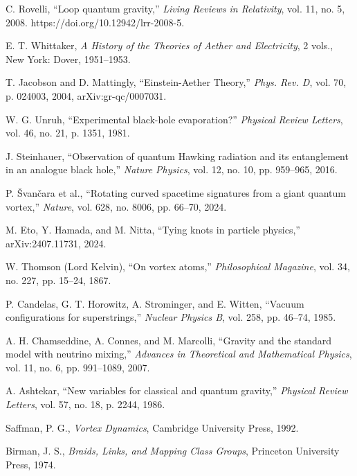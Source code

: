 \begin{thebibliography}{99}

 C. Rovelli, ``Loop quantum gravity,'' \emph{Living Reviews in Relativity}, vol. 11, no. 5, 2008. https://doi.org/10.12942/lrr-2008-5.

 E. T. Whittaker, \emph{A History of the Theories of Aether and Electricity}, 2 vols., New York: Dover, 1951--1953.

 T. Jacobson and D. Mattingly, ``Einstein-Aether Theory,'' \emph{Phys. Rev. D}, vol. 70, p. 024003, 2004, arXiv:gr-qc/0007031.

 W. G. Unruh, ``Experimental black-hole evaporation?'' \emph{Physical Review Letters}, vol. 46, no. 21, p. 1351, 1981.

 J. Steinhauer, ``Observation of quantum Hawking radiation and its entanglement in an analogue black hole,'' \emph{Nature Physics}, vol. 12, no. 10, pp. 959--965, 2016.

 P. Švančara et al., ``Rotating curved spacetime signatures from a giant quantum vortex,'' \emph{Nature}, vol. 628, no. 8006, pp. 66--70, 2024.

 M. Eto, Y. Hamada, and M. Nitta, ``Tying knots in particle physics,'' arXiv:2407.11731, 2024.

 W. Thomson (Lord Kelvin), ``On vortex atoms,'' \emph{Philosophical Magazine}, vol. 34, no. 227, pp. 15--24, 1867.

 P. Candelas, G. T. Horowitz, A. Strominger, and E. Witten, ``Vacuum configurations for superstrings,'' \emph{Nuclear Physics B}, vol. 258, pp. 46--74, 1985.

 A. H. Chamseddine, A. Connes, and M. Marcolli, ``Gravity and the standard model with neutrino mixing,'' \emph{Advances in Theoretical and Mathematical Physics}, vol. 11, no. 6, pp. 991--1089, 2007.

 A. Ashtekar, ``New variables for classical and quantum gravity,'' \emph{Physical Review Letters}, vol. 57, no. 18, p. 2244, 1986.

 Saffman, P. G., \emph{Vortex Dynamics}, Cambridge University Press, 1992.

 Birman, J. S., \emph{Braids, Links, and Mapping Class Groups}, Princeton University Press, 1974.


\end{thebibliography}
